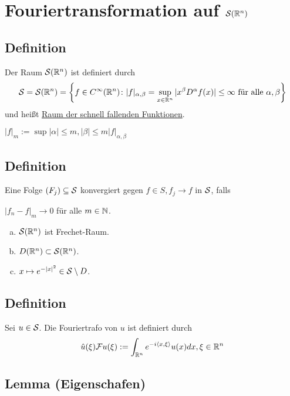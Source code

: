 \section{Fouriertransformation auf $\mathcal{S}(\mathbb{R}^n)$}

\subsection{Definition}

Der Raum $\mathcal{S}(\mathbb{R}^n)$ ist definiert durch
$$
\mathcal{S} = \mathcal{S}(\mathbb{R}^n) = \left\{f \in C^\infty(\mathbb{R}^n) \colon |f|_{\alpha,\beta} = \sup_{x \in \mathbb{R}^n} |x^\beta D^\alpha f(x)| \leq \infty \text{ für alle } \alpha, \beta \right\}
$$
und heißt \underline{Raum der schnell fallenden Funktionen}.

\begin{ntion}
  $|f|_m := \sup{|\alpha|\leq m, |\beta| \leq m} |f|_{\alpha, \beta}$
\end{ntion}

\subsection{Definition}

Eine Folge $(F_j) \subseteq \mathcal{S}$ konvergiert gegen $f \in S, f_j \to f$ in $\mathcal{S}$, falls

$|f_n - f|_m \to 0$ für alle $m \in \mathbb{N}$.

\begin{bem}
  \begin{enumerate}[a)]
    \item $\mathcal{S}(\mathbb{R}^n)$ ist Frechet-Raum.
    \item $D(\mathbb{R}^n) \subset \mathcal{S}(\mathbb{R}^n)$.
    \item $x \mapsto e^{-|x|^2} \in \mathcal{S} \setminus D$.
  \end{enumerate}
\end{bem}

\subsection{Definition}

Sei $u \in \mathcal{S}$.
Die Fouriertrafo von $u$ ist definiert durch
$$
\hat u(\xi) \mathcal{F} u(\xi) := \int_{\mathbb{R}^n} e^{-i \langle x, \xi \rangle} u(x) dx, \xi \in \mathbb{R}^n
$$

\subsection{Lemma (Eigenschafen)}

